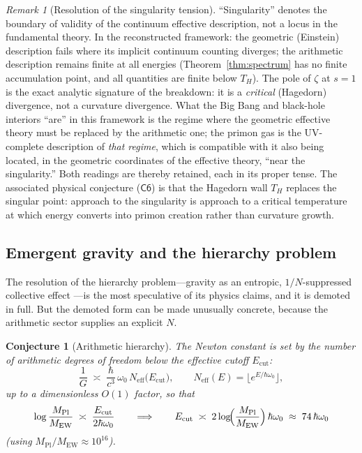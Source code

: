 \documentclass[11pt,a4paper]{article}
\theoremstyle{plain}
\newtheorem{conjecture}{Conjecture}[section]
\theoremstyle{definition}
\theoremstyle{remark}
\newtheorem{remark}[theorem]{Remark}
\begin{document}
\begin{remark}[Resolution of the singularity tension]\label{rem:singularity}
``Singularity'' denotes the boundary of validity of the continuum effective description, not
a locus in the fundamental theory. In the reconstructed framework: the geometric (Einstein)
description fails where its implicit continuum counting diverges; the arithmetic description
remains finite at all energies (Theorem~\ref{thm:spectrum} has no finite accumulation
point, and all quantities are finite below $T_{H}$). The pole of $\zeta$ at $s=1$ is the
exact analytic signature of the breakdown: it is a \emph{critical} (Hagedorn) divergence,
not a curvature divergence. What the Big Bang and black-hole interiors ``are'' in this
framework is the regime where the geometric effective theory must be replaced by the
arithmetic one; the primon gas is the UV-complete description of \emph{that regime}, which is
compatible with it also being located, in the geometric coordinates of the effective theory,
``near the singularity.'' Both readings are thereby retained, each in its
proper tense. The associated physical conjecture ($\mathsf{C6}$) is that the Hagedorn wall
$T_{H}$ replaces the singular point: approach to the singularity is approach to a critical
temperature at which energy converts into primon creation rather than curvature growth.
\end{remark}

\subsection{Emergent gravity and the hierarchy problem}

The resolution of the hierarchy problem---gravity as an entropic, $1/N$-suppressed
collective effect \cite{jacobson1995,verlinde2011,thooft1974}---is the most speculative of
its physics claims, and it is demoted in full. But the demoted form can be made
unusually concrete, because the arithmetic sector supplies an explicit $N$.

\begin{conjecture}[Arithmetic hierarchy]\label{conj:hierarchy}
The Newton constant is set by the number of arithmetic degrees of freedom below the
effective cutoff $E_{\mathrm{cut}}$:
\begin{equation}
\frac{1}{G}\;\asymp\;\frac{\hbar}{c^{3}}\,\omega_{0}\,
N_{\mathrm{eff}}\bigl(E_{\mathrm{cut}}\bigr),
\qquad
N_{\mathrm{eff}}(E)=\lfloor e^{E/\hbar\omega_{0}}\rfloor,
\end{equation}
up to a dimensionless $O(1)$ factor, so that
\begin{equation}\label{eq:hierlog}
\log\frac{M_{\mathrm{Pl}}}{M_{\mathrm{EW}}}\;\asymp\;
\frac{E_{\mathrm{cut}}}{2\hbar\omega_{0}}
\qquad\Longrightarrow\qquad
E_{\mathrm{cut}}\;\asymp\;2\log\!\Bigl(\frac{M_{\mathrm{Pl}}}{M_{\mathrm{EW}}}\Bigr)\,\hbar\omega_{0}
\;\approx\;74\,\hbar\omega_{0}
\end{equation}
(using $M_{\mathrm{Pl}}/M_{\mathrm{EW}}\approx10^{16}$).
\end{conjecture}
\end{document}
